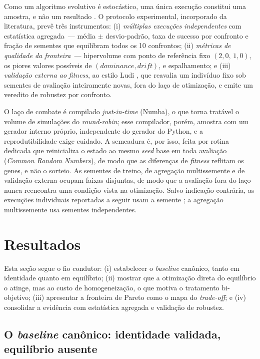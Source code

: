 \documentclass[12pt]{article}
\begin{document}
Como um algoritmo evolutivo é estocástico, uma única execução constitui uma
amostra, e não um resultado \cite{eiben2015introduction,deb2001multiobjective}. O
protocolo experimental, incorporado da literatura, prevê três instrumentos: (i)
\emph{múltiplas execuções independentes} com estatística agregada~--- média $\pm$
desvio-padrão, taxa de sucesso por confronto e fração de sementes que equilibram
todos os 10 confrontos; (ii) \emph{métricas de qualidade da fronteira}~---
hipervolume com ponto de referência fixo $(2{,}0,\,1{,}0)$, os piores valores
possíveis de $(\textit{dominance},\textit{drift})$, e espalhamento; e (iii)
\emph{validação externa ao} \emph{fitness}, ao estilo Ludi
\cite{browne2010evolutionary}, que reavalia um indivíduo fixo sob sementes de
avaliação inteiramente novas, fora do laço de otimização, e emite um veredito de
robustez por confronto.

O laço de combate é compilado \emph{just-in-time} (Numba), o que torna tratável o
volume de simulações do \emph{round-robin}; esse compilador, porém, amostra com um
gerador interno próprio, independente do gerador do Python, e a reprodutibilidade
exige cuidado. A semeadura é, por isso, feita por rotina dedicada que reinicializa
o estado ao mesmo \emph{seed} base em toda avaliação (\emph{Common Random
Numbers}), de modo que as diferenças de \emph{fitness} reflitam os genes, e não o
sorteio. As sementes de treino, de agregação multissemente e de validação externa
ocupam faixas disjuntas, de modo que a avaliação fora do laço nunca reencontra uma
condição vista na otimização. Salvo indicação contrária, as execuções individuais
reportadas a seguir usam a semente \seedMain{}; a agregação multissemente usa \nSeeds{}
sementes independentes.

\section{Resultados}

Esta seção segue o fio condutor: (i) estabelecer o \emph{baseline} canônico, tanto
em identidade quanto em equilíbrio; (ii) mostrar que a otimização direta do
equilíbrio o atinge, mas ao custo de homogeneização, o que motiva o tratamento
bi-objetivo; (iii) apresentar a fronteira de Pareto como o mapa do
\emph{trade-off}; e (iv) consolidar a evidência com estatística agregada e
validação de robustez.

\subsection{O \emph{baseline} canônico: identidade validada, equilíbrio ausente}
\end{document}
